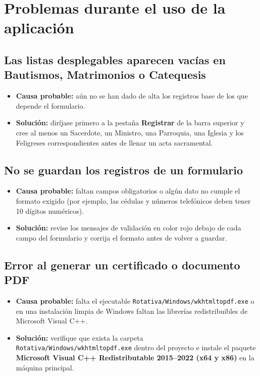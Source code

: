 \section{Problemas durante el uso de la aplicación}

\subsection{Las listas desplegables aparecen vacías en Bautismos, Matrimonios o Catequesis}
\begin{itemize}
    \item \textbf{Causa probable:} aún no se han dado de alta los registros base de los que depende el formulario.
    \item \textbf{Solución:} diríjase primero a la pestaña \textbf{Registrar} de la barra superior y cree al menos un Sacerdote, un Ministro, una Parroquia, una Iglesia y los Feligreses correspondientes antes de llenar un acta sacramental.
\end{itemize}

\subsection{No se guardan los registros de un formulario}
\begin{itemize}
    \item \textbf{Causa probable:} faltan campos obligatorios o algún dato no cumple el formato exigido (por ejemplo, las cédulas y números telefónicos deben tener 10 dígitos numéricos).
    \item \textbf{Solución:} revise los mensajes de validación en color rojo debajo de cada campo del formulario y corrija el formato antes de volver a guardar.
\end{itemize}

\subsection{Error al generar un certificado o documento PDF}
\begin{itemize}
    \item \textbf{Causa probable:} falta el ejecutable \texttt{Rotativa/Windows/wkhtmltopdf.exe} o en una instalación limpia de Windows faltan las librerías redistribuibles de Microsoft Visual C++.
    \item \textbf{Solución:} verifique que exista la carpeta \texttt{Rotativa/Windows/wkhtmltopdf.exe} dentro del proyecto e instale el paquete \textbf{Microsoft Visual C++ Redistributable 2015--2022 (x64 y x86)} en la máquina principal.
\end{itemize}

